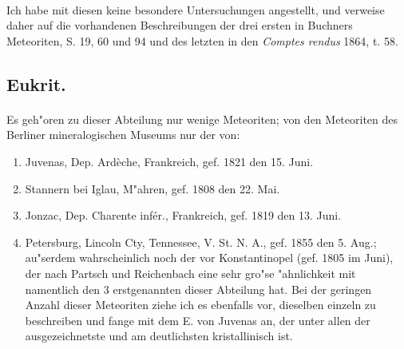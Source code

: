 \documentclass[a4paper, 11pt, oneside]{article}
\begin{document}
\paragraph{}
Ich habe mit diesen keine besondere Untersuchungen angestellt, und verweise daher auf die vorhandenen Beschreibungen der drei ersten in Buchners Meteoriten, S. 19, 60 und 94 und des letzten in den \emph{Comptes rendus} 1864, t. 58.
\subsection{Eukrit.}
\paragraph{}
Es geh"oren zu dieser Abteilung nur wenige Meteoriten; von den Meteoriten des Berliner mineralogischen Museums nur der von:
\begin{enumerate}
    \item Juvenas, Dep. Ardèche, Frankreich, gef. 1821 den 15. Juni.
    \item Stannern bei Iglau, M"ahren, gef. 1808 den 22. Mai.
    \item Jonzac, Dep. Charente infér., Frankreich, gef. 1819 den 13. Juni.
    \item Petersburg, Lincoln Cty, Tennessee, V. St. N. A., gef. 1855 den 5. Aug.; au"serdem wahrscheinlich noch der vor Konstantinopel (gef. 1805 im Juni), der nach Partsch und Reichenbach eine sehr gro"se "ahnlichkeit mit namentlich den 3 erstgenannten dieser Abteilung hat. Bei der geringen Anzahl dieser Meteoriten ziehe ich es ebenfalls vor, dieselben einzeln zu beschreiben und fange mit dem E. von Juvenas an, der unter allen der ausgezeichnetste und am deutlichsten kristallinisch ist.
\end{enumerate}
\end{document}
